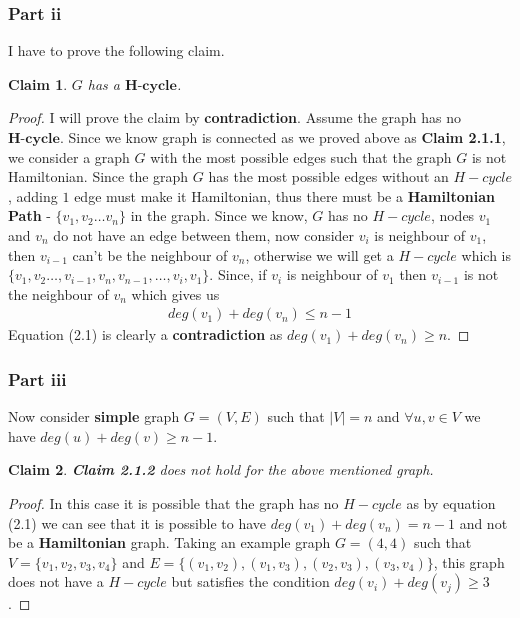 \documentclass{article}
\let\bold\textbf
\newtheorem{claim}{Claim}[subsection]
\begin{document}
{{    \subsubsection{Part ii}{
      I have to prove the following claim.
      \begin{claim}
        $G$ has a $\bold{H-cycle}$.
      \end{claim}
      \begin{proof}
        I will prove the claim by \bold{contradiction}. \newline
        Assume the graph has no $\bold{H-cycle}$. \newline
        Since we know graph is connected as we proved above as \bold{Claim 2.1.1}, we consider a graph $G$ with the most possible edges such that the graph $G$ is not Hamiltonian. \newline
        Since the graph $G$ has the most possible edges without an $H-cycle$, adding $1$ edge must make it Hamiltonian, thus there must be a \bold{Hamiltonian Path} - $\{v_1,v_2\dots v_n\}$ in the graph. \newline
        Since we know, $G$ has no $H-cycle$, nodes $v_1$ and $v_n$ do not have an edge between them, now consider $v_i$ is neighbour of $v_1$, then $v_{i-1}$ can't be the neighbour of $v_n$, otherwise we will get a $H-cycle$ which is $\{v_1,v_2\dots,v_{i-1},v_n,v_{n-1},\dots,v_i,v_1\}$. \newline
        Since, if $v_i$ is neighbour of $v_1$ then $v_{i-1}$ is not the neighbour of $v_n$ which gives us 
        \begin{align}
          deg(v_1)+deg(v_n) \leq n-1 \label{eq:1}
        \end{align}
        Equation (2.1) is clearly a \bold{contradiction} as $deg(v_1)+deg(v_n) \geq n$.
      \end{proof}
    }
    \subsubsection{Part iii}{
      Now consider \bold{simple} graph $G=(V,E)$ such that $\mid V\mid =n$ and $\forall u,v \in V$ we have $deg(u)+deg(v) \geq n-1$.
      \begin{claim}
        \bold{Claim 2.1.2} does not hold for the above mentioned graph.
      \end{claim}
      \begin{proof}
      In this case it is possible that the graph has no $H-cycle$ as by equation (2.1) we can see that it is possible to have $deg(v_1)+deg(v_n)=n-1$ and not be a \bold{Hamiltonian} graph. \newline
      Taking an example graph $G=(4,4)$ such that $V=\{v_1,v_2,v_3,v_4\}$ and $E=\{(v_1,v_2),(v_1,v_3),(v_2,v_3),(v_3,v_4)\}$, this graph does not have a $H-cycle$ but satisfies the condition $deg(v_i)+deg(v_j) \geq 3$.
    \end{proof}
    }
  }
}
\end{document}
